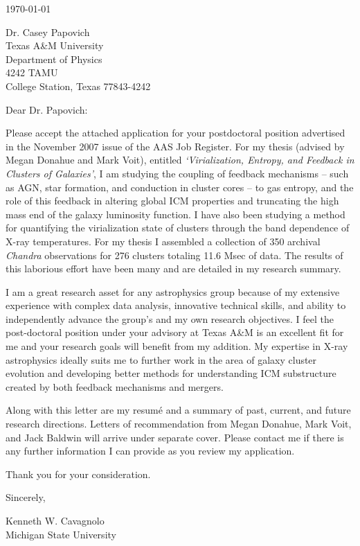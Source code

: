 \documentclass[11pt]{article}
\begin{document}
\today

Dr. Casey Papovich\\
Texas A\&M University\\
Department of Physics\\
4242 TAMU\\
College Station, Texas 77843-4242

Dear Dr. Papovich:

Please accept the attached application for your postdoctoral
position advertised in the November 2007 issue of the AAS Job
Register. For my thesis (advised by Megan Donahue and  Mark Voit),
entitled {\it `Virialization, Entropy, and Feedback in Clusters of
Galaxies'}, I am studying the coupling of feedback mechanisms -- such
as AGN, star formation, and conduction in cluster cores -- to gas
entropy, and the role of this feedback in altering global ICM
properties and truncating the high mass end of the galaxy luminosity
function. I have also been studying a method for quantifying the
virialization state of clusters through the band dependence of X-ray
temperatures. For my thesis I assembled a collection of 350 archival
{\textit{Chandra}} observations for 276 clusters totaling 11.6 Msec of
data. The results of this laborious effort have been many and are
detailed in my research summary.

I am a great research asset for any astrophysics group because of my
extensive experience with complex data analysis, innovative technical
skills, and ability to independently advance the group's and my own
research objectives. I feel the post-doctoral position under your
advisory at Texas A\&M is an excellent fit for me and your research
goals will benefit from my addition. My expertise in X-ray
astrophysics ideally suits me to further work in the area of galaxy
cluster evolution and developing better methods for understanding ICM
substructure created by both feedback mechanisms and mergers.

Along with this letter are my resum\'{e} and a summary of past,
current, and future research directions. Letters of recommendation
from Megan Donahue, Mark Voit, and Jack Baldwin will arrive under
separate cover. Please contact me if there is any further information
I can provide as you review my application.

Thank you for your consideration.

Sincerely,\\
\begin{minipage}{7.5in}
\end{minipage}
Kenneth W. Cavagnolo\\
Michigan State University
\end{document}
